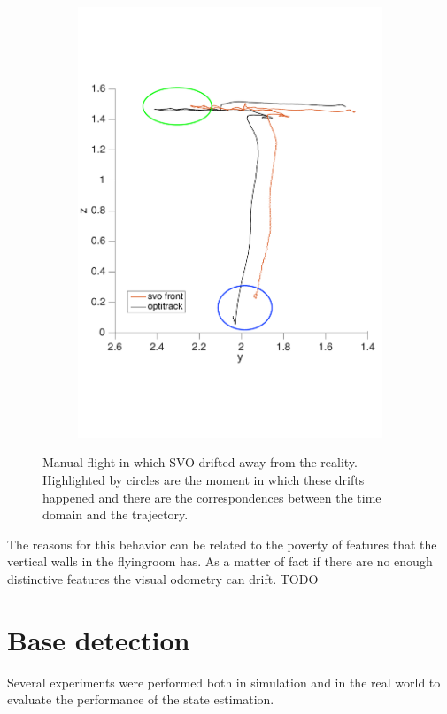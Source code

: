 \begin{figure}[!htbp]
\begin{subfigure}[b]{0.4\textwidth}
        \includegraphics[width=\textwidth]{img/fly_with_landing_trajectory_y.pdf}
        \label{fig:comparision_svo_position_drifting_y}
   \end{subfigure}
  \caption{Manual flight in which SVO drifted away from the reality. Highlighted by circles are the moment in which these drifts happened and there are the correspondences between the time domain and the trajectory. }
  \label{fig:svo_position_driftind}
\end{figure} 

The reasons for this behavior can be related to the poverty of features that the vertical walls in the flyingroom has. As a matter of fact if there are no enough distinctive features the visual odometry can drift. TODO 



\section{Base detection}
Several experiments were performed both in simulation and in the real world to evaluate the performance of the state estimation.
